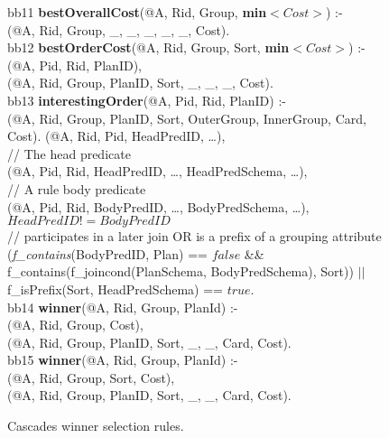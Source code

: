\begin{figure*}
\ssp
\centering
\begin{boxedminipage}{\linewidth}
bb11 {\bf bestOverallCost}(@A, Rid, Group, {\bf min}$<Cost>$) :- \\
(@A, Rid, Group, \_, \_, \_, \_, \_, Cost). \\

bb12 {\bf bestOrderCost}(@A, Rid, Group, Sort, {\bf min}$<Cost>$) :- \\
(@A, Pid, Rid, PlanID), \\
(@A, Rid, Group, PlanID, Sort, \_, \_, \_, Cost). \\

bb13 {\bf interestingOrder}(@A, Pid, Rid, PlanID) :- \\
(@A, Rid, Group, PlanID, Sort, OuterGroup, InnerGroup, Card, Cost).
(@A, Rid, Pid, HeadPredID, \ldots), \\
\datalogspace // The head predicate \\
(@A, Pid, Rid, HeadPredID, \ldots, HeadPredSchema, \ldots),\\
\datalogspace // A rule body predicate \\
(@A, Pid, Rid, BodyPredID, \ldots, BodyPredSchema, \ldots),\\
\datalogspace $HeadPredID != BodyPredID$ \\
\datalogspace // participates in a later join OR is a prefix of a grouping attribute \\ 
\datalogspace ({\em f\_contains}(BodyPredID, Plan) ==  $false$ \&\& \\
\datalogspace f\_contains(f\_joincond(PlanSchema, BodyPredSchema), Sort)) $||$ \\
\datalogspace f\_isPrefix(Sort, HeadPredSchema) ==  $true$.  \\

bb14 {\bf winner}(@A, Rid, Group, PlanId) :- \\
(@A, Rid, Group, Cost), \\
(@A, Rid, Group, PlanID, Sort, \_, \_, Card, Cost). \\

bb15 {\bf winner}(@A, Rid, Group, PlanId) :- \\
(@A, Rid, Group, Sort, Cost), \\
(@A, Rid, Group, PlanID, Sort, \_, \_, Card, Cost).

\end{boxedminipage}
\caption{\label{ch:opt:fig:cascades_winner} Cascades winner selection rules.}
\end{figure*}

